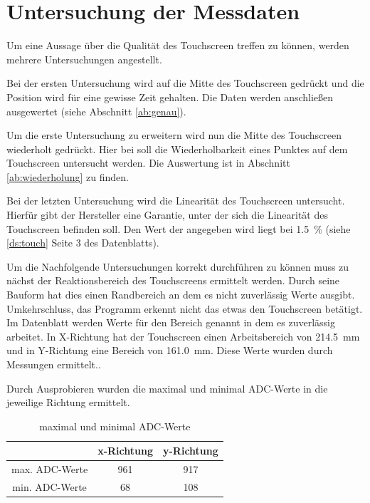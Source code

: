 \chapter{Untersuchung der Messdaten}
Um eine Aussage über die Qualität des Touchscreen treffen zu können, werden mehrere Untersuchungen angestellt. 

Bei der ersten Untersuchung wird auf die Mitte des Touchscreen gedrückt und die Position wird für eine gewisse Zeit gehalten.
Die Daten werden anschließen ausgewertet (siehe Abschnitt \ref{ab:genau}).

Um die erste Untersuchung zu erweitern wird nun die Mitte des Touchscreen wiederholt gedrückt. Hier bei soll die Wiederholbarkeit eines Punktes auf dem Touchscreen untersucht werden. 
Die Auswertung ist in Abschnitt \ref{ab:wiederholung} zu finden.

Bei der letzten Untersuchung wird die Linearität des Touchscreen untersucht. Hierfür gibt der Hersteller eine Garantie, unter der sich die Linearität des Touchscreen befinden soll. 
Den Wert der angegeben wird liegt bei \SI{1,5}{\%} (siehe \ref{ds:touch} Seite 3 des Datenblatts).

Um die Nachfolgende Untersuchungen korrekt durchführen zu können muss zu nächst der Reaktionsbereich des Touchscreens ermittelt werden.
Durch seine Bauform hat dies einen Randbereich an dem es nicht zuverlässig Werte ausgibt. Umkehrschluss, das Programm erkennt nicht das etwas den Touchscreen betätigt. 
Im Datenblatt werden Werte für den Bereich genannt in dem es zuverlässig arbeitet. In X-Richtung hat der Touchscreen einen Arbeitsbereich von \SI{214,5}{mm} und in Y-Richtung eine Bereich von \SI{161,0}{mm}. Diese Werte wurden durch Messungen ermittelt..

Durch Ausprobieren wurden die maximal und minimal ADC-Werte in die jeweilige Richtung ermittelt. 
\begin{table}[ht!]
    \caption{maximal und minimal ADC-Werte}
    \begin{center}
        \begin{tabular}{ c |c| c }
                & x-Richtung & y-Richtung \\ \hline
         max. ADC-Werte & 961 & 917 \\  \hline
         min. ADC-Werte& 68 & 108 \\   
        \end{tabular}
    \end{center}   
\end{table}

